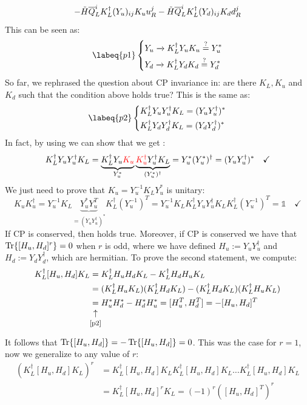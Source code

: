 \documentclass[../main.tex]{subfiles}
\begin{document}
\[
-\Tilde{H}\overline{Q}_L^iK_L^\dagger(Y_u)_{ij}K_uu_R^j-\Tilde{H}\overline{Q}_L^iK_L^\dagger(Y_d)_{ij}K_dd_R^j
\]
This can be seen as:
\begin{equation}
\labeq{p1}
\left\{
\begin{aligned}
&Y_u\xrightarrow[]{}K_L^\dagger Y_uK_u\stackrel{?}{=}Y_u^*\\
&Y_d\xrightarrow[]{}K_L^\dagger Y_dK_d\stackrel{?}{=}Y_d^*
\end{aligned}
\right.
\end{equation}
So far, we rephrased the question about CP invariance in: are there $K_L,K_u$ and $K_d$ such that the condition above holds true? This is the same as:
\begin{equation}
\labeq{p2}
\left\{
\begin{aligned}
&K_L^\dagger Y_uY_u^\dagger K_L=(Y_uY_u^\dagger)^*\\
&K_L^\dagger Y_dY_d^\dagger K_L=(Y_dY_d^\dagger)^*
\end{aligned}
\right.
\end{equation}
In fact, by using  we can show that we get :
\[
K_L^\dagger Y_uY_u^\dagger K_L=\underbrace{K_L^\dagger Y_u{\color{red}K_u}}_{Y_u^*}\underbrace{{\color{red}K_u^\dagger}Y_u^\dagger K_L}_{(Y_u^*)^\dagger}=Y_u^*(Y_u^*)^\dagger=(Y_uY_u^\dagger)^* \quad \checkmark
\]
We just need to prove that $K_u=Y_u^{-1}K_LY_u^*$ is unitary:
\[
K_uK_u^\dagger=Y_u^{-1}K_L\underbrace{Y_u^*Y_u^T}_{=(Y_uY_u^\dagger)^*}K_L^\dagger(Y_u^{-1})^T=Y_u^{-1}K_LK_L^\dagger Y_uY_u^\dagger K_LK_L^\dagger(Y_u^{-1})^T=\mathbb{1} \quad \checkmark
\]
If CP is conserved, then  holds true. Moreover, if CP is conserved we have that $\Tr{[H_u,H_d]^r}=0$ when $r$ is odd, where we have defined $H_u:=Y_uY_u^\dagger$ and $H_d:=Y_dY_d^\dagger$, which are hermitian. To prove the second statement, we compute:
\begin{align*}
K_L^\dagger[H_u,H_d]K_L&=K_L^\dagger H_uH_dK_L-K_L^\dagger H_dH_uK_L\\
&=(K_L^\dagger H_uK_L)(K_L^\dagger H_dK_L)-(K_L^\dagger H_dK_L)(K_L^\dagger H_uK_L)\\
&\underset{\mathclap{\tikz \node {$\uparrow$} node [below=1ex] {\footnotesize \refeq{p2} };}}{=}H_u^*H_d^*-H_d^*H_u^*=[H_u^T,H_d^T]=-[H_u,H_d]^T
\end{align*}
It follows that $\Tr{[H_u,H_d]}=-\Tr{[H_u,H_d]}=0$. This was the case for $r=1$, now we generalize to any value of $r$:
\begin{align*}
\left(K_L^\dagger[H_u,H_d]K_L\right)^r&=K_L^\dagger[H_u,H_d]K_LK_L^\dagger[H_u,H_d]K_L\dots K_L^\dagger[H_u,H_d]K_L\\
&=K_L^\dagger[H_u,H_d]^rK_L=(-1)^r\left([H_u,H_d]^T\right)^r
\end{align*}
\end{document}
